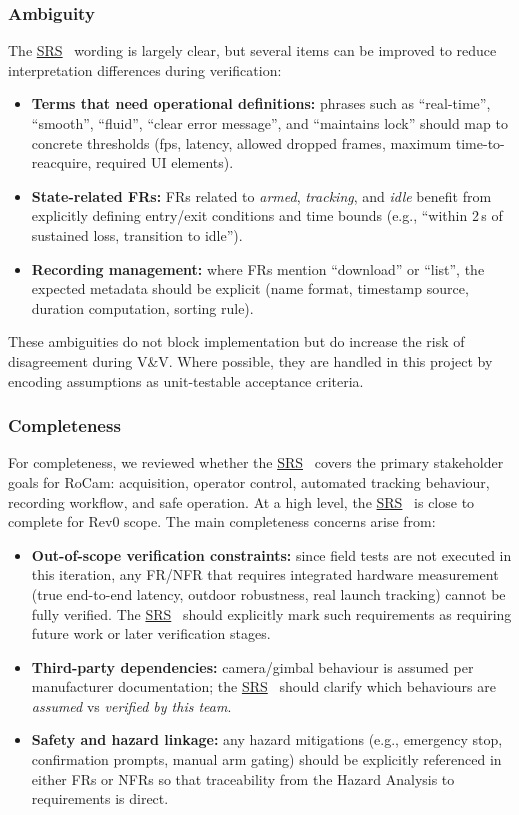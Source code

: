 \documentclass[12pt, titlepage]{article}
\newcommand{\SRS}{\href{../SRS/SRS.pdf}{SRS}}
\begin{document}
\subsubsection{Ambiguity}
The \SRS~\cite{SRS} wording is largely clear, but several items can be improved
to reduce interpretation differences during verification:
\begin{itemize}
  \item \textbf{Terms that need operational definitions:} phrases such as
        ``real-time'', ``smooth'', ``fluid'', ``clear error message'', and
        ``maintains lock'' should map to concrete thresholds (fps, latency,
        allowed dropped frames, maximum time-to-reacquire, required UI elements).
  \item \textbf{State-related FRs:} FRs related to \textit{armed}, \textit{tracking},
        and \textit{idle} benefit from explicitly defining entry/exit conditions and
        time bounds (e.g., ``within 2\,s of sustained loss, transition to idle'').
  \item \textbf{Recording management:} where FRs mention ``download'' or ``list'',
        the expected metadata should be explicit (name format, timestamp source,
        duration computation, sorting rule).
\end{itemize}
These ambiguities do not block implementation but do increase the risk of
disagreement during V\&V. Where possible, they are handled in this project by
encoding assumptions as unit-testable acceptance criteria.

\subsubsection{Completeness}
For completeness, we reviewed whether the \SRS~\cite{SRS} covers the primary
stakeholder goals for RoCam: acquisition, operator control, automated tracking
behaviour, recording workflow, and safe operation. At a high level, the
\SRS~\cite{SRS} is close to complete for Rev0 scope. The main completeness
concerns arise from:
\begin{itemize}
  \item \textbf{Out-of-scope verification constraints:} since field tests are
        not executed in this iteration, any FR/NFR that requires
        integrated hardware measurement (true end-to-end latency, outdoor
        robustness, real launch tracking) cannot be fully verified. The \SRS~\cite{SRS}
        should explicitly mark such requirements as requiring future work or
        later verification stages.
  \item \textbf{Third-party dependencies:} camera/gimbal behaviour is assumed
        per manufacturer documentation; the \SRS~\cite{SRS} should clarify which behaviours
        are \textit{assumed} vs \textit{verified by this team}.
  \item \textbf{Safety and hazard linkage:} any hazard mitigations (e.g.,
        emergency stop, confirmation prompts, manual arm gating) should be
        explicitly referenced in either FRs or NFRs so that traceability from the
        Hazard Analysis to requirements is direct.
\end{itemize}
\end{document}
